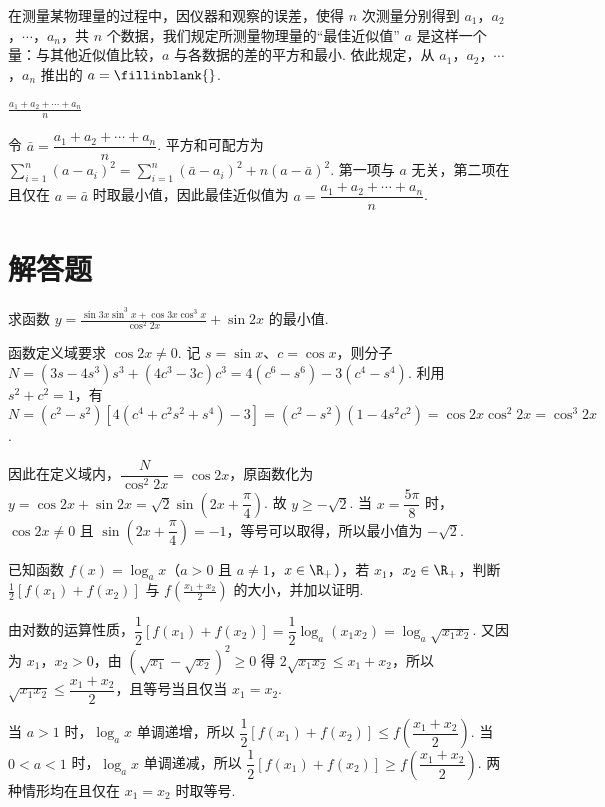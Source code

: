 \documentclass[UTF8,a4paper,oneside,11pt]{ctexbook}
\begin{document}
\begin{problem}
在测量某物理量的过程中，因仪器和观察的误差，使得 \(n\) 次测量分别得到 \(a_{1}\)，\(a_{2}\)，\(\cdots\)，\(a_{n}\)，共 \(n\) 个数据，我们规定所测量物理量的“最佳近似值” \(a\) 是这样一个量：与其他近似值比较，\(a\) 与各数据的差的平方和最小. 依此规定，从 \(a_{1}\)，\(a_{2}\)，\(\cdots\)，\(a_{n}\) 推出的 \(a =\fillinblank{}\).
\end{problem}

\begin{answer}
\(\frac{a_1+a_2+\cdots+a_n}{n}\)
\end{answer}

\begin{solution}
令 \(\bar a=\dfrac{a_1+a_2+\cdots+a_n}{n}\). 平方和可配方为
\(\sum_{i=1}^{n}(a-a_i)^2=\sum_{i=1}^{n}(\bar a-a_i)^2+n(a-\bar a)^2\). 第一项与 \(a\) 无关，第二项在且仅在 \(a=\bar a\) 时取最小值，因此最佳近似值为 \(a=\dfrac{a_1+a_2+\cdots+a_n}{n}\).
\end{solution}

\section{解答题}

\begin{problem}
求函数 \(y = \frac{\sin 3x\sin^3 x + \cos 3x\cos^3 x}{\cos^2 2x} + \sin 2x \) 的最小值.
\end{problem}

\begin{solution}
函数定义域要求 \(\cos2x\neq0\). 记 \(s=\sin x\)、\(c=\cos x\)，则分子
\(N=(3s-4s^3)s^3+(4c^3-3c)c^3=4(c^6-s^6)-3(c^4-s^4)\). 利用 \(s^2+c^2=1\)，有
\(N=(c^2-s^2)\left[4(c^4+c^2s^2+s^4)-3\right]=(c^2-s^2)(1-4s^2c^2)=\cos2x\cos^2 2x=\cos^3 2x\).

因此在定义域内，\(\dfrac{N}{\cos^2 2x}=\cos2x\)，原函数化为 \(y=\cos2x+\sin2x=\sqrt2\sin\left(2x+\dfrac\pi4\right)\). 故 \(y\geqslant-\sqrt2\). 当 \(x=\dfrac{5\pi}{8}\) 时，\(\cos2x\neq0\) 且 \(\sin\left(2x+\dfrac\pi4\right)=-1\)，等号可以取得，所以最小值为 \(-\sqrt2\).
\end{solution}

\begin{problem}
已知函数 \(f(x) = \log_a x\)（\(a > 0\) 且 \(a \neq 1\)，\(x \in \R_+\)），若 \(x_1\)，\(x_2 \in \R_+\)，判断 \(\frac{1}{2} [f(x_1) + f(x_2)] \) 与 \(f\left(\frac{x_1 + x_2}{2}\right) \) 的大小，并加以证明.
\end{problem}

\begin{solution}
由对数的运算性质，\(\dfrac12[f(x_1)+f(x_2)]=\dfrac12\log_a(x_1x_2)=\log_a\sqrt{x_1x_2}\). 又因为 \(x_1\)，\(x_2>0\)，由 \(\left(\sqrt{x_1}-\sqrt{x_2}\right)^2\geqslant0\) 得 \(2\sqrt{x_1x_2}\leqslant x_1+x_2\)，所以 \(\sqrt{x_1x_2}\leqslant\dfrac{x_1+x_2}{2}\)，且等号当且仅当 \(x_1=x_2\).

当 \(a>1\) 时，\(\log_a x\) 单调递增，所以 \(\dfrac12[f(x_1)+f(x_2)]\leqslant f\left(\dfrac{x_1+x_2}{2}\right)\). 当 \(0<a<1\) 时，\(\log_a x\) 单调递减，所以 \(\dfrac12[f(x_1)+f(x_2)]\geqslant f\left(\dfrac{x_1+x_2}{2}\right)\). 两种情形均在且仅在 \(x_1=x_2\) 时取等号.
\end{solution}
\end{document}

